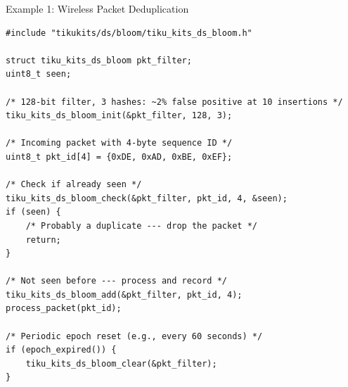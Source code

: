 \documentclass[aspectratio=169, 10pt]{beamer}
\begin{document}
\begin{frame}[fragile]{Example 1: Wireless Packet Deduplication}
\begin{lstlisting}[style=cstyle,
  title={Reject already-seen packets using a Bloom filter}]
#include "tikukits/ds/bloom/tiku_kits_ds_bloom.h"

struct tiku_kits_ds_bloom pkt_filter;
uint8_t seen;

/* 128-bit filter, 3 hashes: ~2% false positive at 10 insertions */
tiku_kits_ds_bloom_init(&pkt_filter, 128, 3);

/* Incoming packet with 4-byte sequence ID */
uint8_t pkt_id[4] = {0xDE, 0xAD, 0xBE, 0xEF};

/* Check if already seen */
tiku_kits_ds_bloom_check(&pkt_filter, pkt_id, 4, &seen);
if (seen) {
    /* Probably a duplicate --- drop the packet */
    return;
}

/* Not seen before --- process and record */
tiku_kits_ds_bloom_add(&pkt_filter, pkt_id, 4);
process_packet(pkt_id);

/* Periodic epoch reset (e.g., every 60 seconds) */
if (epoch_expired()) {
    tiku_kits_ds_bloom_clear(&pkt_filter);
}
\end{lstlisting}
\end{frame}
\end{document}
